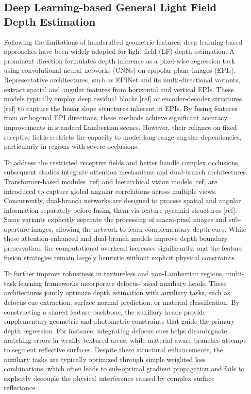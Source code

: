 \documentclass[lettersize,journal]{IEEEtran}
\begin{document}
\subsection{Deep Learning-based General Light Field Depth Estimation}

Following the limitations of handcrafted geometric features, deep learning-based approaches have been widely adopted for light field (LF) depth estimation. A prominent direction formulates depth inference as a pixel-wise regression task using convolutional neural networks (CNNs) on epipolar plane images (EPIs). Representative architectures, such as EPINet and its multi-directional variants, extract spatial and angular features from horizontal and vertical EPIs. These models typically employ deep residual blocks [ref] or encoder-decoder structures [ref] to capture the linear slope structures inherent in EPIs. By fusing features from orthogonal EPI directions, these methods achieve significant accuracy improvements in standard Lambertian scenes. However, their reliance on fixed receptive fields restricts the capacity to model long-range angular dependencies, particularly in regions with severe occlusions.

To address the restricted receptive fields and better handle complex occlusions, subsequent studies integrate attention mechanisms and dual-branch architectures. Transformer-based modules [ref] and hierarchical vision models [ref] are introduced to capture global angular correlations across multiple views. Concurrently, dual-branch networks are designed to process spatial and angular information separately before fusing them via feature pyramid structures [ref]. Some variants explicitly separate the processing of macro-pixel images and sub-aperture images, allowing the network to learn complementary depth cues. While these attention-enhanced and dual-branch models improve depth boundary preservation, the computational overhead increases significantly, and the feature fusion strategies remain largely heuristic without explicit physical constraints.

To further improve robustness in textureless and non-Lambertian regions, multi-task learning frameworks incorporate defocus-based auxiliary heads. These architectures jointly optimize depth estimation with auxiliary tasks, such as defocus cue extraction, surface normal prediction, or material classification. By constructing a shared feature backbone, the auxiliary heads provide supplementary geometric and photometric constraints that guide the primary depth regression. For instance, integrating defocus cues helps disambiguate matching errors in weakly textured areas, while material-aware branches attempt to segment reflective surfaces. Despite these structural enhancements, the auxiliary tasks are typically optimized through simple weighted loss combinations, which often leads to sub-optimal gradient propagation and fails to explicitly decouple the physical interference caused by complex surface reflectance.
\end{document}
